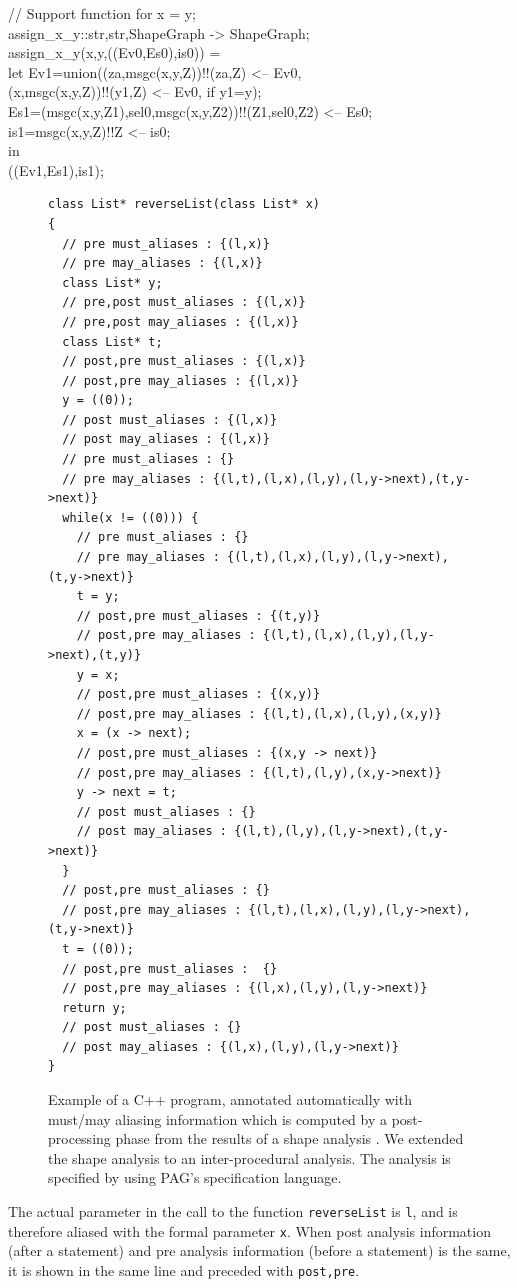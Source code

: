\documentclass[a4paper,12pt]{report}
\begin{document}
{{\begin{sourcelisting}
// Support function for x = y; \\
assign_x_y::str,str,ShapeGraph -> ShapeGraph;\\
assign_x_y(x,y,((Ev0,Es0),is0)) =\\
  let Ev1=union({(za,msgc(x,y,Z))!!(za,Z) <-- Ev0},\\
              {(x,msgc(x,y,Z))!!(y1,Z) <-- Ev0, if y1=y});\\
      Es1={(msgc(x,y,Z1),sel0,msgc(x,y,Z2))!!(Z1,sel0,Z2) <-- Es0};\\
      is1={msgc(x,y,Z)!!Z <-- is0}; \\
  in\\
      ((Ev1,Es1),is1);\\
\end{sourcelisting}
}

\begin{figure}
\begin{verbatim}
class List* reverseList(class List* x)
{
  // pre must_aliases : {(l,x)} 
  // pre may_aliases : {(l,x)}  
  class List* y; 
  // pre,post must_aliases : {(l,x)}  
  // pre,post may_aliases : {(l,x)}  
  class List* t; 
  // post,pre must_aliases : {(l,x)}  
  // post,pre may_aliases : {(l,x)}  
  y = ((0)); 
  // post must_aliases : {(l,x)}  
  // post may_aliases : {(l,x)}  
  // pre must_aliases : {} 
  // pre may_aliases : {(l,t),(l,x),(l,y),(l,y->next),(t,y->next)}  
  while(x != ((0))) { 
    // pre must_aliases : {} 
    // pre may_aliases : {(l,t),(l,x),(l,y),(l,y->next),(t,y->next)}  
    t = y; 
    // post,pre must_aliases : {(t,y)}  
    // post,pre may_aliases : {(l,t),(l,x),(l,y),(l,y->next),(t,y)}  
    y = x; 
    // post,pre must_aliases : {(x,y)}  
    // post,pre may_aliases : {(l,t),(l,x),(l,y),(x,y)}  
    x = (x -> next); 
    // post,pre must_aliases : {(x,y -> next)}  
    // post,pre may_aliases : {(l,t),(l,y),(x,y->next)}  
    y -> next = t; 
    // post must_aliases : {} 
    // post may_aliases : {(l,t),(l,y),(l,y->next),(t,y->next)}  
  } 
  // post,pre must_aliases : {} 
  // post,pre may_aliases : {(l,t),(l,x),(l,y),(l,y->next),(t,y->next)}  
  t = ((0)); 
  // post,pre must_aliases :  {}
  // post,pre may_aliases : {(l,x),(l,y),(l,y->next)}  
  return y; 
  // post must_aliases : {} 
  // post may_aliases : {(l,x),(l,y),(l,y->next)}  
} 
\end{verbatim}
\caption{Example of a C++ program, annotated automatically with must/may
aliasing information which is computed by a post-processing phase from
the results of a shape analysis \cite{SRW98}. We extended the shape
analysis to an inter-procedural analysis. The analysis is specified by using PAG's specification language.}
\label{fig:example}
\end{figure}

The actual parameter in the call to the function \verb+reverseList+ is
\verb+l+, and is therefore aliased with the formal parameter
\verb+x+. When post analysis information (after a statement) and pre
analysis information (before a statement) is the same, it is shown in the same
line and preceded with \verb+post,pre+.
}
\end{document}
